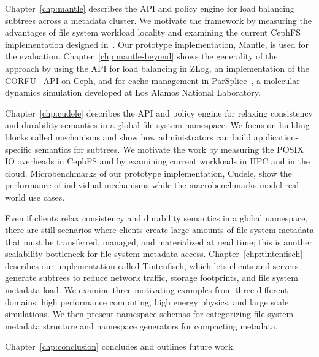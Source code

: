 Chapter~\ref{chp:mantle} describes the API and policy engine for load balancing
subtrees across a metadata cluster. We motivate the framework by measuring the
advantages of file system workload locality and examining the current CephFS
implementation designed in~\cite{weil:osdi2006-ceph, weil:sc2004-dyn-metadata}.
Our prototype implementation, Mantle, is used for the evaluation.
Chapter~\ref{chp:mantle-beyond} shows the generality of the approach by using
the API for load balancing in ZLog, an implementation of the
CORFU~\cite{balakrishnan_corfu_2012} API on Ceph, and for cache management in
ParSplice~\cite{perez:jctc20150parsplice}, a molecular dynamics simulation
developed at Los Alamos National Laboratory.

Chapter~\ref{chp:cudele} describes the API and policy engine for relaxing
consistency and durability semantics in a global file system namespace. We
focus on building blocks called mechanisms and show how administrators can
build application-specific semantics for subtrees.  We motivate the work by
measuring the POSIX IO overheads in CephFS and by examining current workloads
in HPC and in the cloud. Microbenchmarks of our prototype implementation,
Cudele, show the performance of individual mechanisms while the macrobenchmarks
model real-world use cases.

Even if clients relax consistency and durability semantics in a global
namespace, there are still scenarios where clients create large amounts of file
system metadata that must be transferred, managed, and materialized at read
time; this is another scalability bottleneck for file system metadata access.
Chapter~\ref{chp:tintenfisch} describes our implementation called Tintenfisch,
which lets clients and servers generate subtrees to reduce network traffic,
storage footprints, and file system metadata load. We examine three motivating
examples from three different domains: high performance computing, high energy
physics, and large scale simulations. We then present namespace schemas for
categorizing file system metadata structure and namespace generators for
compacting metadata.

Chapter~\ref{chp:conclusion} concludes and outlines future work.


